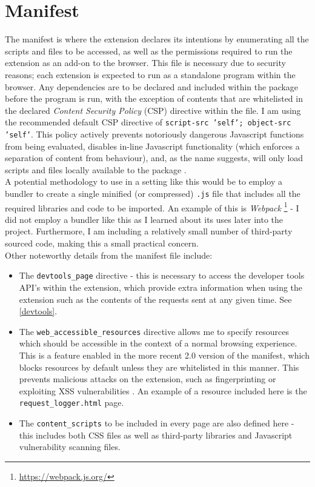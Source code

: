 \section{Manifest}

The manifest is where the extension declares its intentions by enumerating all the scripts and files to be accessed, as well as the permissions required to run the extension as an add-on to the browser. This file is necessary due to security reasons; each extension is expected to run as a standalone program within the browser. Any dependencies are to be declared and included within the package before the program is run, with the exception of contents that are whitelisted in the declared \textit{Content Security Policy} (CSP) directive within the file. I am using the recommended default CSP directive of \texttt{script-src 'self'; object-src 'self'}. This policy actively prevents notoriously dangerous Javascript functions from being evaluated, disables in-line Javascript functionality (which enforces a separation of content from behaviour), and, as the name suggests, will only load scripts and files locally available to the package \cite{chromeExtensionCSP}. \\ 

A potential methodology to use in a setting like this would be to employ a bundler to create a single minified (or compressed) \texttt{.js} file that includes all the required libraries and code to be imported. An example of this is  \textit{Webpack} \footnote{\url{https://webpack.js.org/}} - I did not employ a bundler like this as I learned about its uses later into the project. Furthermore, I am including a relatively small number of third-party sourced code, making this a small practical concern. \\

Other noteworthy details from the manifest file include:

\begin{itemize}
	\item The \texttt{devtools\_page} directive - this is necessary to access the developer tools API's within the extension, which provide extra information when using the extension such as the contents of the requests sent at any given time. See \ref{devtools}.
	
	\item The \texttt{web\_accessible\_resources} directive allows me to specify resources which should be accessible in the context of a normal browsing experience. This is a feature enabled in the more recent 2.0 version of the manifest, which blocks resources by default unless they are whitelisted in this manner. This prevents malicious attacks on the extension, such as fingerprinting or exploiting XSS vulnerabilities \cite{chromeExtensionWebAccessibleResources}. An example of a resource included here is the \texttt{request\_logger.html} page.
	
	\item The \texttt{content\_scripts} to be included in every page are also defined here - this includes both CSS files as well as third-party libraries and Javascript vulnerability scanning files.
\end{itemize}

